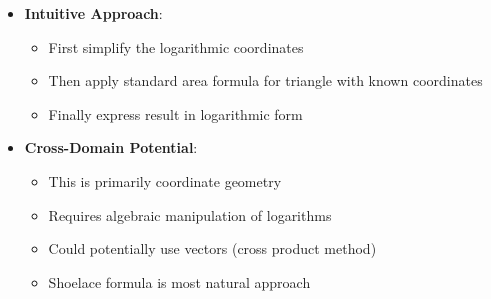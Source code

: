 \documentclass[12pt]{article}
\begin{document}
\begin{problemconfigbox}
\begin{itemize}[leftmargin=*]
    \item \textbf{Intuitive Approach}: 
    \begin{itemize}
        \item First simplify the logarithmic coordinates
        \item Then apply standard area formula for triangle with known coordinates
        \item Finally express result in logarithmic form
    \end{itemize}
    
    \item \textbf{Cross-Domain Potential}: 
    \begin{itemize}
        \item This is primarily coordinate geometry
        \item Requires algebraic manipulation of logarithms
        \item Could potentially use vectors (cross product method)
        \item Shoelace formula is most natural approach
    \end{itemize}
\end{itemize}
\end{problemconfigbox}
\end{document}
